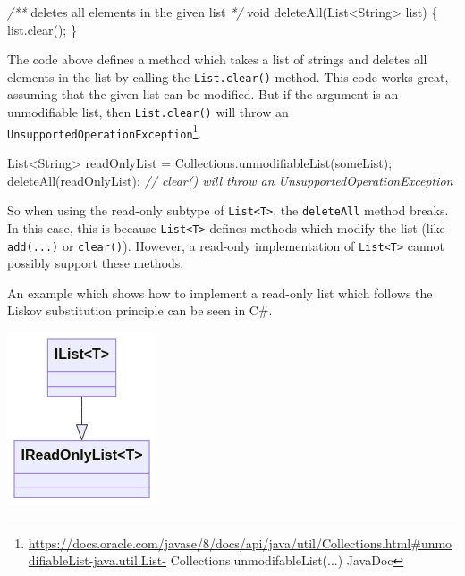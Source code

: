 \documentclass[
]{article}
\newenvironment{Shaded}{}{}
\newcommand{\BuiltInTok}[1]{\textcolor[rgb]{0.00,0.50,0.00}{#1}}
\newcommand{\CommentTok}[1]{\textcolor[rgb]{0.38,0.63,0.69}{\textit{#1}}}
\newcommand{\DataTypeTok}[1]{\textcolor[rgb]{0.56,0.13,0.00}{#1}}
\newcommand{\FunctionTok}[1]{\textcolor[rgb]{0.02,0.16,0.49}{#1}}
\newcommand{\NormalTok}[1]{#1}
\newcommand{\OperatorTok}[1]{\textcolor[rgb]{0.40,0.40,0.40}{#1}}
\begin{document}
\begin{Shaded}
\begin{Highlighting}[]
\CommentTok{/**}\NormalTok{ deletes all elements in the given list }\CommentTok{*/}
\DataTypeTok{void} \FunctionTok{deleteAll}\OperatorTok{(}\BuiltInTok{List}\OperatorTok{\textless{}}\BuiltInTok{String}\OperatorTok{\textgreater{}}\NormalTok{ list}\OperatorTok{)} \OperatorTok{\{}
\NormalTok{    list}\OperatorTok{.}\FunctionTok{clear}\OperatorTok{();}
\OperatorTok{\}}
\end{Highlighting}
\end{Shaded}

The code above defines a method which takes a list of strings and
deletes all elements in the list by calling the \texttt{List.clear()}
method. This code works great, assuming that the given list can be
modified. But if the argument is an unmodifiable list, then
\texttt{List.clear()} will throw an
\texttt{UnsupportedOperationException}\footnote{\url{https://docs.oracle.com/javase/8/docs/api/java/util/Collections.html\#unmodifiableList-java.util.List-}
  Collections.unmodifableList(...) JavaDoc}.

\begin{Shaded}
\begin{Highlighting}[]
\BuiltInTok{List}\OperatorTok{\textless{}}\BuiltInTok{String}\OperatorTok{\textgreater{}}\NormalTok{ readOnlyList }\OperatorTok{=} \BuiltInTok{Collections}\OperatorTok{.}\FunctionTok{unmodifiableList}\OperatorTok{(}\NormalTok{someList}\OperatorTok{);}
\FunctionTok{deleteAll}\OperatorTok{(}\NormalTok{readOnlyList}\OperatorTok{);} \CommentTok{// clear() will throw an UnsupportedOperationException}
\end{Highlighting}
\end{Shaded}

So when using the read-only subtype of
\texttt{List\textless{}T\textgreater{}}, the \texttt{deleteAll} method
breaks. In this case, this is because
\texttt{List\textless{}T\textgreater{}} defines methods which modify the
list (like \texttt{add(...)} or \texttt{clear()}). However, a read-only
implementation of \texttt{List\textless{}T\textgreater{}} cannot
possibly support these methods.

An example which shows how to implement a read-only list which follows
the Liskov substitution principle can be seen in C\#.

\includegraphics[width=1.73958in,height=\textheight]{16940112915012.png}
\end{document}
